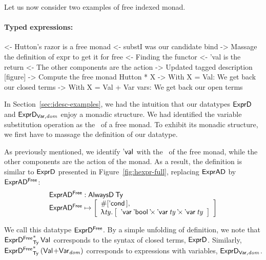 Let us now consider two examples of free indexed monad.


\paragraph{Typed expressions:}

\begin{wstructure}
<- Hutton's razor is a free monad
    <- substI was our candidate bind
        -> Massage the definition of expr to get it for free
    <- Finding the functor
        <- 'val is the return
        <- The other components are the action
        -> Updated tagged description [figure]
    -> Compute the free monad Hutton * X
        -> With X = Val: We get back our closed terms
        -> With X = Val + Var vars: We get back our open terms
\end{wstructure}

In Section~\ref{sec:idesc-examples}, we had the intuition that our
datatypes $\HExprD$ and $\HExprVarD{\V{dom}}$ enjoy a monadic
structure. We had identified the variable substitution operation as
the \bind\ of a free monad. To exhibit its monadic structure, we first
have to massage the definition of our datatype.

As previously mentioned, we identify $\Eval{\!}$ with the \return\ of
the free monad, while the other components are the action of the
monad. As a result, the definition is similar to $\HExprD$ presented
in Figure~\ref{fig:hexpr-full}, replacing $\HExprAD$ by
$\HExprAFreeD$:
%
\[\stk{
\HExprAFreeD : \ATagIDesc{\Ty} \\
\HExprAFreeD \mapsto \bigRedBracket{
                 \begin{array}{l}
                   \EnumT{\sqr{\Econd{\!}{\!}{\!}}} \red{,} \\
                   \LAM{\V{ty}}
                   \bigRedBracket{
                   \begin{array}{l}
                   \DProd{\DVar{\Ebool}}{\DProd{\DVar{\V{ty}}}{\DVar{\V{ty}}}}
                   \end{array}
                   }
                 \end{array}
                 }
}\]

We call this datatype $\HExprFreeD$. By a simple unfolding of
definition, we note that $\FreeIMonad{\HExprFreeD}{\Ty}{\Val{\!}}$
corresponds to the syntax of closed terms, $\HExprD$. Similarly,
$\FreeIMonad{\HExprFreeD}{\Ty}{(\SUM{\Val{\!}}{\Var{\V{dom}}{}})}$
corresponds to expressions with variables, $\HExprVarD{\V{dom}}$.


